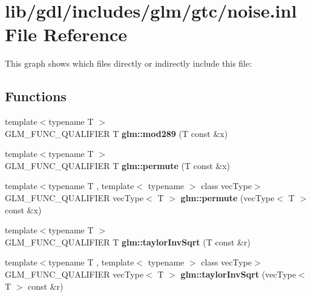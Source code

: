 \hypertarget{noise_8inl}{}\section{lib/gdl/includes/glm/gtc/noise.inl File Reference}
\label{noise_8inl}
This graph shows which files directly or indirectly include this file\+:
\subsection*{Functions}
\begin{DoxyCompactItemize}
\item 
\hypertarget{namespaceglm_a200b37daa4ca17e31138a434c7078548}{}{\footnotesize template$<$typename T $>$ }\\G\+L\+M\+\_\+\+F\+U\+N\+C\+\_\+\+Q\+U\+A\+L\+I\+F\+I\+E\+R T {\bfseries glm\+::mod289} (T const \&x)\label{namespaceglm_a200b37daa4ca17e31138a434c7078548}

\item 
\hypertarget{namespaceglm_a5c902737963cf157830767d21bf9d037}{}{\footnotesize template$<$typename T $>$ }\\G\+L\+M\+\_\+\+F\+U\+N\+C\+\_\+\+Q\+U\+A\+L\+I\+F\+I\+E\+R T {\bfseries glm\+::permute} (T const \&x)\label{namespaceglm_a5c902737963cf157830767d21bf9d037}

\item 
\hypertarget{namespaceglm_ae224d11727219390dbd151410b6be972}{}{\footnotesize template$<$typename T , template$<$ typename $>$ class vec\+Type$>$ }\\G\+L\+M\+\_\+\+F\+U\+N\+C\+\_\+\+Q\+U\+A\+L\+I\+F\+I\+E\+R vec\+Type$<$ T $>$ {\bfseries glm\+::permute} (vec\+Type$<$ T $>$ const \&x)\label{namespaceglm_ae224d11727219390dbd151410b6be972}

\item 
\hypertarget{namespaceglm_ab3d958b06e46c58ce0d3353b4f0a5892}{}{\footnotesize template$<$typename T $>$ }\\G\+L\+M\+\_\+\+F\+U\+N\+C\+\_\+\+Q\+U\+A\+L\+I\+F\+I\+E\+R T {\bfseries glm\+::taylor\+Inv\+Sqrt} (T const \&r)\label{namespaceglm_ab3d958b06e46c58ce0d3353b4f0a5892}

\item 
\hypertarget{namespaceglm_a6c5622a1dda3109e9735f0383cd515eb}{}{\footnotesize template$<$typename T , template$<$ typename $>$ class vec\+Type$>$ }\\G\+L\+M\+\_\+\+F\+U\+N\+C\+\_\+\+Q\+U\+A\+L\+I\+F\+I\+E\+R vec\+Type$<$ T $>$ {\bfseries glm\+::taylor\+Inv\+Sqrt} (vec\+Type$<$ T $>$ const \&r)\label{namespaceglm_a6c5622a1dda3109e9735f0383cd515eb}


\end{DoxyCompactItemize}
